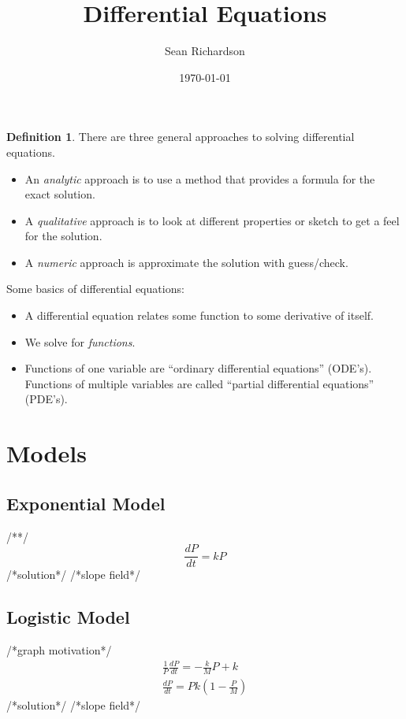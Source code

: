 \documentclass[11pt]{article}
\theoremstyle{definition}
\newtheorem{definition}[theorem]{Definition}
\newcommand{\der}[2]{\frac{d{#1}}{d{#2}}}
\begin{document}
\title{Differential Equations}
\author{Sean Richardson}
\date{\today}
\maketitle

\section{}
\begin{definition}
There are three general approaches to solving differential equations.
    \begin{itemize}
        \item An \emph{analytic} approach is to use a method that provides
            a formula for the exact solution.
        \item A \emph{qualitative} approach is to look at different
            properties or sketch to get a feel for the solution.
        \item A \emph{numeric} approach is approximate the solution with
            guess/check.
    \end{itemize}
\end{definition}

Some basics of differential equations:
\begin{itemize}
    \item A differential equation relates some function to some derivative
        of itself.
    \item We solve for \emph{functions}.
    \item Functions of one variable are ``ordinary differential
        equations'' (ODE's). Functions of multiple variables are called
        ``partial differential equations'' (PDE's).
\end{itemize}

\section{Models}
\subsection{Exponential Model}
/**/
\begin{equation}
    \der{P}{t} = kP
\end{equation}
/*solution*/
/*slope field*/

\subsection{Logistic Model}
/*graph motivation*/
\begin{align}
    \frac{1}{P}\der{P}{t}=-\frac{k}{M}P+k \nonumber \\
    \der{P}{t}=Pk(1-\frac{P}{M})
\end{align}
/*solution*/
/*slope field*/
\end{document}

